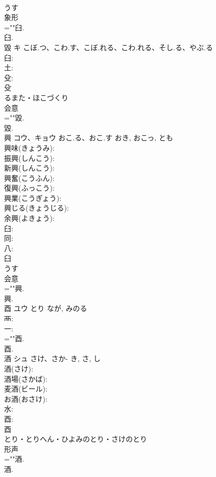 \documentclass[8pt]{extreport}
\begin{document}
\begin{CJK}{UTF8}{min}
\\	うす	
\\	象形 
\\	=""臼.
\\	臼.
\\	毀	キ	こぼ.つ、こわ.す、こぼ.れる、こわ.れる、そし.る、やぶ.る		
\\	臼: 
\\	土: 
\\	殳: 
\\	殳	
\\	るまた・ほこづくり	
\\	会意 
\\	=""毀.
\\	毀.
\\	興	コウ、キョウ	おこ.る、おこ.す	おき, おこっ, とも	
\\	興味(きょうみ): 
\\	振興(しんこう): 
\\	新興(しんこう): 
\\	興奮(こうふん): 
\\	復興(ふっこう): 
\\	興業(こうぎょう): 
\\	興じる(きょうじる): 
\\	余興(よきょう): 
\\	臼: 
\\	同: 
\\	八: 
\\	臼	
\\	うす	
\\	会意 
\\	=""興.
\\	興.
\\	酉	ユウ	とり	なが, みのる	
\\	襾: 
\\	一: 
\\	=""酉.
\\	酉.
\\	酒	シュ	さけ、さか-	き, さ, し	
\\	酒(さけ): 
\\	酒場(さかば): 
\\	麦酒(ビール): 
\\	お酒(おさけ): 
\\	水: 
\\	酉: 
\\	酉	
\\	とり・とりへん・ひよみのとり・さけのとり	
\\	形声 
\\	=""酒.
\\	酒.

\end{CJK}
\end{document}
